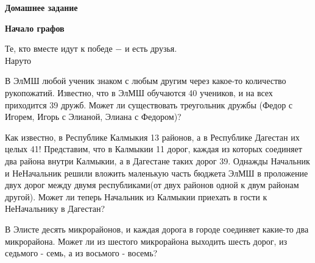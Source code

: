 \centerline{\bf \Huge Домашнее задание}
\centerline{\bf \Huge  Начало графов}


\begin{flushright}
        \scriptsize{Те, кто вместе идут к победе $-$ и есть друзья. \\Наруто}
\end{flushright}


 В ЭлМШ любой ученик знаком с любым другим через какое-то количество рукопожатий. Известно, что в ЭлМШ обучаются 40 учеников, и на всех приходится 39 дружб. Может ли существовать треугольник дружбы (Федор с Игорем, Игорь с Элианой, Элиана с Федором)?
  
 Как известно, в Республике Калмыкия 13 районов, а в Республике Дагестан их целых 41! Представим, что в Калмыкии 11 дорог, каждая из которых соединяет два района внутри Калмыкии, а в Дагестане таких дорог 39. Однажды Начальник и НеНачальник решили вложить маленькую часть бюджета ЭлМШ в проложение двух дорог между двумя республиками(от двух районов одной к двум районам другой). Может ли теперь Начальник из Калмыкии приехать в гости к НеНачальнику в Дагестан?

 В Элисте десять микрорайонов, и каждая дорога в городе соединяет какие-то два микрорайона. Может ли из шестого микрорайона выходить шесть дорог, из седьмого - семь, а из восьмого - восемь?
